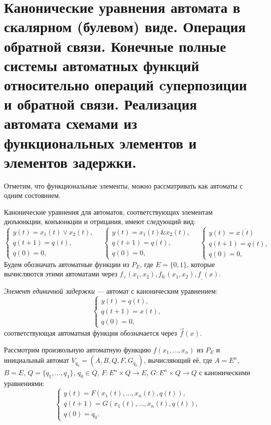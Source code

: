 \section{Канонические уравнения автомата в скалярном (булевом) виде. Операция обратной связи. Конечные полные системы автоматных функций относительно операций cуперпозиции и обратной связи. Реализация автомата схемами из функциональных элементов и элементов задержки.}

Отметим, что функциональные элементы, можно рассматривать как автоматы с одним состоянием.

\begin{definition}
    Канонические уравнения для автоматов, соответствующих элементам дизъюнкции, конъюнкции и отрицания, имеют следующий вид:
    \[
        \begin{cases}
            y(t) = x_1(t)\vee x_2(t),\\
            q(t+1) = q(t),\\
            q(0)=0,
        \end{cases}
        \quad
        \begin{cases}
            y(t) = x_1(t)\&x_2(t),\\
            q(t+1) = q(t),\\
            q(0)=0,
        \end{cases}
        \quad
        \begin{cases}
            y(t) = \overline{x(t)}\,\\
            q(t+1) = q(t),\\
            q(0)=0,
        \end{cases}
    \]
    Будем обозначать автоматные функции из $P_E$, где $E=\{0, 1\}$, которые вычисляются этими автоматами через $f_\vee(x_1, x_2), f_\&(x_1,x_2), f_\_(x)$.
\end{definition}

\begin{definition}
    \textit{Элемент единичной задержки} --- автомат с каноническим уравнением:
    \[
    \begin{cases}
            y(t) = q(t),\\
            q(t+1) = x(t),\\
            q(0)=0,
    \end{cases}
    \]
    соответствующая автоматная функция обозначается через $\vec{f}(x)$.
\end{definition}

Рассмотрим произвольную автоматную функцию $f(x_1, \ldots, x_n)$ из $P_E$ и инициальный автомат $V_{q_0} = (A, B, Q, F, G_{q_0})$, вычисляющий её, где $A=E^n$, $B=E$, $Q=\{q_1, \ldots, q_\lambda\}$, $q_0 \in Q$, $F:E^n \times Q \to E$, $G:E^n \times Q \to Q$ с каноническими уравнениями:
\[
    \begin{cases}
        y(t) = F(x_1(t), \ldots, x_n(t), q(t)),\\
        q(t+1) = G(x_1(t), \ldots, x_n(t), q(t)),\\
        q(0) = q_0.
    \end{cases}
\]

